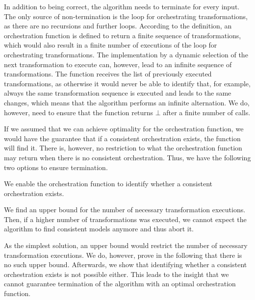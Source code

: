 In addition to being correct, the algorithm needs to terminate for every input.
The only source of non-termination is the loop for orchestrating transformations, as there are no recursions and further loops.
According to the definition, an orchestration function is defined to return a finite sequence of transformations, which would also result in a finite number of executions of the loop for orchestrating transformations.
The implementation by a dynamic selection of the next transformation to execute can, however, lead to an infinite sequence of transformations.
The  function receives the list of previously executed transformations, as otherwise it would never be able to identify that, for example, always the same transformation sequence is executed and leads to the same changes, which means that the algorithm performs an infinite alternation.
We do, however, need to ensure that the  function returns $\bot$ after a finite number of calls.

If we assumed that we can achieve optimality for the orchestration function, we would have the guarantee that if a consistent orchestration exists, the function will find it.
There is, however, no restriction to what the orchestration function may return when there is no consistent orchestration.
Thus, we have the following two options to ensure termination.
\begin{longenumerate}
    \item We enable the orchestration function to identify whether a consistent orchestration exists.
    \item We find an upper bound for the number of necessary transformation executions. Then, if a higher number of transformations was executed, we cannot expect the algorithm to find consistent models anymore and thus abort it.
\end{longenumerate}

As the simplest solution, an upper bound would restrict the number of necessary transformation executions.
We do, however, prove in the following that there is no such upper bound.
Afterwards, we show that identifying whether a consistent orchestration exists is not possible either.
This leads to the insight that we cannot guarantee termination of the algorithm with an optimal orchestration function.



